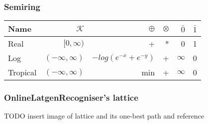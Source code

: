 \begin{frame} \frametitle{Semiring}
\begin{tabular}{lrrrrr}
\hline
Name & $\mathcal{K}$ & $\oplus$ & $ \otimes$ & $\bar{0}$ & $\bar{1}$ \\ 
\hline
Real        & $[0,\infty)$        &  +                     &  * &  0        &  1  \\
Log         & $(-\infty, \infty)$ & $-log(e^{-x} + e^{-y})$ & + &  $\infty$ &  0  \\
Tropical    & $(-\infty, \infty)$ &  min                   &  + &  $\infty$ &  0  \\
\hline
\end{tabular}
\end{frame}

\begin{frame} \frametitle{OnlineLatgenRecogniser's lattice}
    TODO insert image of lattice and its one-best path and reference
\end{frame}

